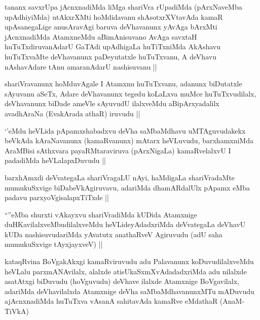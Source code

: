 \begin{artha}
tananx savxrUpa jAcnxnadiMda liMga shariVra rUpadiMda (pArxNaveMba upAdhiyiMda) utAkxrXMti hoMdidavanu shAsotxrXVtavAda kamaR upAsanegaLige anusAravAgi baruva deVhavanunx yAvAga bArxMti jAcnxnadiMda AtamxneMdu aBimAnisuvano AvAga savxtaH huTuTxdiruvanAdarU GaTAdi upAdhigaLa huTiTxniMda AkAshavu huTuTxvaMte deVhavanunx paDeyutatxle huTuTxvanu, A deVhavu nAshavAdare tAnu amaranAdarU nashisuvanu ||
\end{artha}

\begin{artha}
shariVravanunx hoMduvAgale I Atamxnu huTuTxvanu, adanunx biDutatxle sAyuvanu aSeTx, Adare deVhavanunx tegedu koLaLxva muMce huTuTxvudilalx, deVhavanunx biDade ameVle sAyuvudU ilalxveMdu aBipArxyadalilx avadhAraNa (EvakArada athaR) iruvudu ||
\end{artha}


\begin{artha}
`\stext'eMdu heVLida pApamxshabadxvu deVha saMbaMdhavu uMTAguvudakekx beVkAda kAraNavanunx (kamaRvanunx) mAtarx heVLuvudu, barxhamxniMda AraMBisi sAthxvara payaRMtaraviruva (pArxNigaLa) kamaRvelalxvU I padadiMda heVLalapxDuvudu ||
\end{artha}


\begin{artha}
barxhAmxdi deVvategaLa shariVragaLU nAyi, haMdigaLa shariVradaMte mumukuSxvige biDabeVkAgiruvavu, adariMda dhamARdalUlx pApamx eMba padavu parxyoVgisalapxTiTxde ||
\end{artha}


\begin{artha}
``\stext''eMba shurxti vAkayxvu shariVradiMda kUDida Atamxnige duHKavilalxveMbudilalxveMdu heVLideyAdadxriMda deVvategaLa deVhavU kUDa nashisuvudariMda yAvatutx anathaRveV Agiruvudu (adU saha mumukuSxvige tAyxjayxveV) ||
\end{artha}


\begin{artha}
kataqRvina BoVgakAkxgi kamaRviruvudu adu Palavanunx koDuvudilalxveMdu heVLalu parxmANAvilalx, alalxde atisUkaSxmXvAdadadxriMda adu nilalxde asatAtxgi biDuvudu (hoVguvudu) deVhave ilalxde Atamxnige BoVgavilalx, adariMda deVhavilalxda Atamxnige deVha saMbaMdhavanunxMTu mADuvudu ajAcnxnadiMda huTuTxva vAsanA sahitavAda kamaRve eMdathaR (AnaM-TiVkA)
\end{artha}

